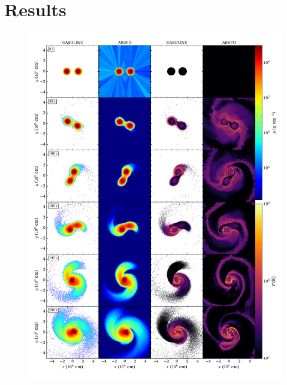 \section{Results}
\label{sec:c3_results}


\begin{figure}
\centering
\includegraphics[angle=0,width=1.0\columnwidth]{chapter3_zhu+u/figures/snapshots1.pdf}
\end{figure}
